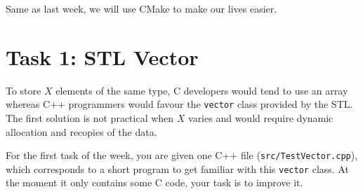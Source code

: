 Same as last week, we will use CMake to make our lives easier. 

\section*{Task 1: STL Vector}

To store $X$ elements of the same type,
C developers would tend to use an array whereas C++ programmers would favour the \verb+vector+ class provided by the STL. 
The first solution is not practical when $X$ varies and would require dynamic allocation and recopies of the data. 

For the first task of the week, you are given one C++ file (\verb+src/TestVector.cpp+), which corresponds to a short program to get familiar with this \verb+vector+ class. At the moment it only contains some C code, your task is to improve it. 

